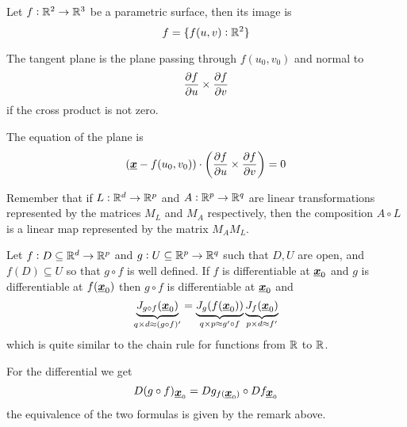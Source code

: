 \documentclass[12pt]{extarticle}
\renewcommand{\vec}[1]{\uvec{#1}}
\begin{document}
\begin{example}
    Let $f: \mathbb{R}^2 \to \mathbb{R}^3$ be a parametric surface, then its image is
    \begin{equation}
        f = \{ f(u, v) : \mathbb{R}^2 \}
    \end{equation}

    The tangent plane is the plane passing through $f(u_0, v_0)$ and normal to
    \begin{equation}
        \pdv{f}{u}() \times \pdv{f}{v}()
    \end{equation}
    if the cross product is not zero.

    The equation of the plane is
    \begin{equation}
        (\vec{x} - f(u_0, v_0)) \cdot \left( \pdv{f}{u}() \times \pdv{f}{v}() \right) = 0
    \end{equation}

\end{example}


\begin{remark}
    Remember that if $L: \mathbb{R}^d \to \mathbb{R}^p$ and $A: \mathbb{R}^p \to \mathbb{R}^q$ are linear transformations represented by the matrices $M_L$ and $M_A$ respectively, then the composition $A \circ L$ is a linear map represented by the matrix $M_A M_L$.
\end{remark}

\begin{theorem}
    Let $f: D \subseteq \mathbb{R}^d \to \mathbb{R}^p$ and $g: U \subseteq \mathbb{R}^p \to \mathbb{R}^q$ such that $D, U$ are open, and $f(D) \subseteq U$ so that $g \circ f$ is well defined.
    If $f$ is differentiable at $\vec{x}_0$ and $g$ is differentiable at $f(\vec{x}_0)$ then $g \circ f$ is differentiable at $\vec{x}_0$ and
    \begin{equation}
        \underbrace{J_{g \circ f}(\vec{x}_0)}_{q \times d \approx (g \circ f)'} =
        \underbrace{J_g(f(\vec{x}_0))}_{q \times p \approx g' \circ f}
        \underbrace{J_f(\vec{x}_0)}_{p \times d \approx f'}
    \end{equation}
    which is quite similar to the chain rule for functions from $\mathbb{R}$ to $\mathbb{R}$.

    For the differential we get
    \begin{equation}
        D(g \circ f)_{\vec{x}_0} = Dg_{f(\vec{x}_0)} \circ Df_{\vec{x}_0}
    \end{equation}
    the equivalence of the two formulas is given by the remark above.
\end{theorem}
\end{document}
